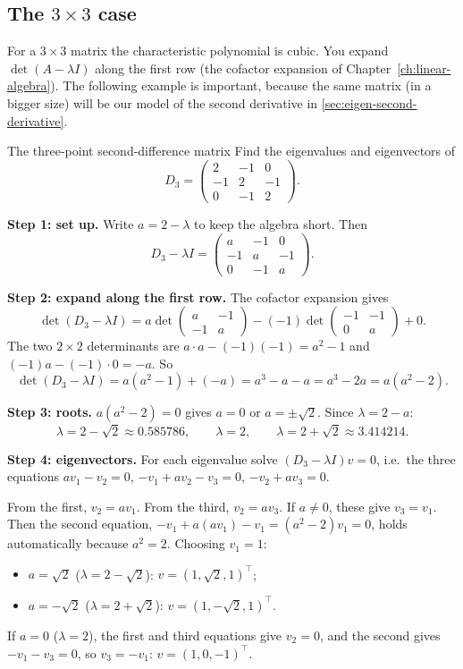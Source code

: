 \subsection{The $3\times3$ case}

For a $3\times3$ matrix the characteristic polynomial is cubic. You expand $\det(A-\lambda I)$ along the first row (the cofactor expansion of Chapter~\ref{ch:linear-algebra}). The following example is important, because the same matrix (in a bigger size) will be our model of the second derivative in \cref{sec:eigen-second-derivative}.

\begin{sample}{The three-point second-difference matrix}
Find the eigenvalues and eigenvectors of
\[
D_3=\begin{pmatrix}2&-1&0\\-1&2&-1\\0&-1&2\end{pmatrix}.
\]

\textbf{Step 1: set up.} Write $a=2-\lambda$ to keep the algebra short. Then
\[
D_3-\lambda I=\begin{pmatrix}a&-1&0\\-1&a&-1\\0&-1&a\end{pmatrix}.
\]

\textbf{Step 2: expand along the first row.} The cofactor expansion gives
\[
\det(D_3-\lambda I)=a\det\begin{pmatrix}a&-1\\-1&a\end{pmatrix}-(-1)\det\begin{pmatrix}-1&-1\\0&a\end{pmatrix}+0.
\]
The two $2\times2$ determinants are $a\cdot a-(-1)(-1)=a^2-1$ and $(-1)a-(-1)\cdot0=-a$. So
\[
\det(D_3-\lambda I)=a(a^2-1)+(-a)=a^3-a-a=a^3-2a=a(a^2-2).
\]

\textbf{Step 3: roots.} $a(a^2-2)=0$ gives $a=0$ or $a=\pm\sqrt2$. Since $\lambda=2-a$:
\[
\lambda=2-\sqrt2\approx0.585786,\qquad \lambda=2,\qquad \lambda=2+\sqrt2\approx3.414214.
\]

\textbf{Step 4: eigenvectors.} For each eigenvalue solve $(D_3-\lambda I)v=0$, i.e.\ the three equations $av_1-v_2=0$, $-v_1+av_2-v_3=0$, $-v_2+av_3=0$.

From the first, $v_2=av_1$. From the third, $v_2=av_3$. If $a\ne0$, these give $v_3=v_1$. Then the second equation, $-v_1+a(av_1)-v_1=(a^2-2)v_1=0$, holds automatically because $a^2=2$. Choosing $v_1=1$:
\begin{itemize}
\item $a=\sqrt2$ ($\lambda=2-\sqrt2$): $v=(1,\sqrt2,1)^\top$;
\item $a=-\sqrt2$ ($\lambda=2+\sqrt2$): $v=(1,-\sqrt2,1)^\top$.
\end{itemize}
If $a=0$ ($\lambda=2$), the first and third equations give $v_2=0$, and the second gives $-v_1-v_3=0$, so $v_3=-v_1$: $v=(1,0,-1)^\top$.


\end{sample}
